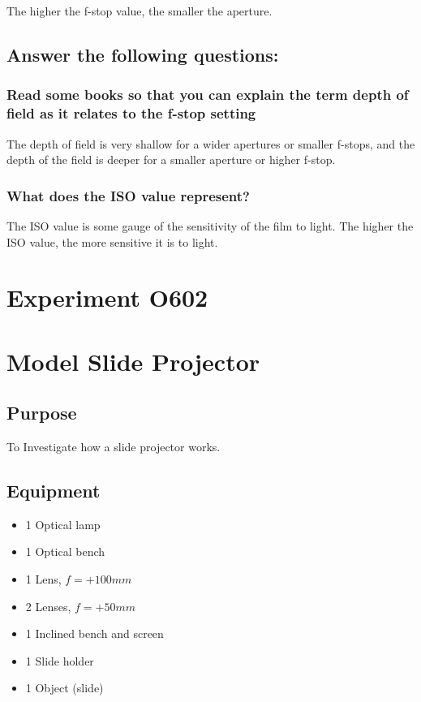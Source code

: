 \documentclass[12pt]{article}
\begin{document}
The higher the f-stop value, the smaller the aperture.

\subsection*{Answer the following questions:}

\subsubsection*{Read some books so that you can explain the term depth of field as it relates to the f-stop setting}

The depth of field is very shallow for a wider apertures or smaller f-stops, and the depth of the field is deeper for a smaller aperture or higher f-stop.

\subsubsection*{What does the ISO value represent?}

The ISO value is some gauge of the sensitivity of the film to light. The higher the ISO value, the more sensitive it is to light.

\newpage

\section*{Experiment O602}

\section*{Model Slide Projector}

\subsection*{Purpose}
To Investigate how a slide projector works.

\subsection*{Equipment}

\begin{itemize}
    \item 1 Optical lamp
    \item 1 Optical bench
    \item 1 Lens, $f=+100 mm$
    \item 2 Lenses, $f=+50 mm$
    \item 1 Inclined bench and screen
    \item 1 Slide holder
    \item 1 Object (slide)
\end{itemize}
\end{document}
